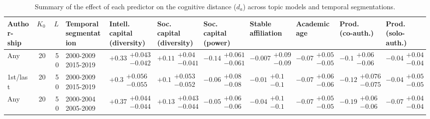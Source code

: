 \begin{table}[H]
\caption{Summary of the effect of each predictor on the cognitive distance ($d_a$) across topic models and temporal segmentations.}
\label{table:full_summary_disruption}
\renewcommand{\arraystretch}{2}\fontsize{6}{7}\selectfont\begin{tabular}{lrrllllllll}
\toprule
\makecell{Author-\\ ship} & $K_0$ & $L$ & \makecell{Temporal \\ segmentation} & \makecell{Intell. capital \\ (diversity)} & \makecell{Soc. capital \\ (diversity)} & \makecell{Soc. capital \\ (power)} & \makecell{Stable \\ affiliation} & \makecell{Academic \\ age} & \makecell{Prod. \\ (co-auth.)} & \makecell{Prod. \\ (solo-auth.)} \\
\midrule
Any & 20 & 50 & \makecell{2000-2009 \\ 2015-2019} & $\bm{+0.33}\substack{+0.043 \\ -0.042}$ & $\bm{+0.11}\substack{+0.04 \\ -0.041}$ & $\bm{-0.14}\substack{+0.061 \\ -0.061}$ & $-0.007\substack{+0.09 \\ -0.09}$ & $\bm{-0.07}\substack{+0.05 \\ -0.05}$ & $\bm{-0.1}\substack{+0.06 \\ -0.06}$ & $-0.04\substack{+0.04 \\ -0.04}$ \\
1st/last & 20 & 50 & \makecell{2000-2009 \\ 2015-2019} & $\bm{+0.3}\substack{+0.056 \\ -0.055}$ & $\bm{+0.1}\substack{+0.053 \\ -0.052}$ & $-0.06\substack{+0.08 \\ -0.08}$ & $-0.01\substack{+0.1 \\ -0.1}$ & $\bm{-0.07}\substack{+0.06 \\ -0.06}$ & $\bm{-0.12}\substack{+0.076 \\ -0.075}$ & $-0.04\substack{+0.05 \\ -0.05}$ \\
Any & 20 & 50 & \makecell{2000-2004 \\ 2005-2009} & $\bm{+0.37}\substack{+0.044 \\ -0.044}$ & $\bm{+0.13}\substack{+0.043 \\ -0.044}$ & $-0.05\substack{+0.06 \\ -0.06}$ & $-0.04\substack{+0.1 \\ -0.1}$ & $\bm{-0.07}\substack{+0.05 \\ -0.05}$ & $\bm{-0.19}\substack{+0.06 \\ -0.06}$ & $\bm{-0.07}\substack{+0.04 \\ -0.04}$ \\

\end{tabular}
\end{table}
